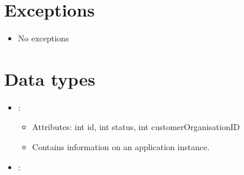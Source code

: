 
\section{Exceptions}\label{sec:exceptions}
\begin{itemize}[nolistsep,noitemsep]
\item[] No exceptions
\end{itemize}

\section{Data types}\label{sec:datatypes}
\begin{itemize}[nolistsep,noitemsep]
\item {}: 
\begin{itemize}[noitemsep,nolistsep]
\item[] Attributes: int id, int status, int customerOrganisationID
\item[] Contains information on an application instance.
\end{itemize}
\item {}: 
\begin{itemize}


\end{itemize}
\end{itemize}
